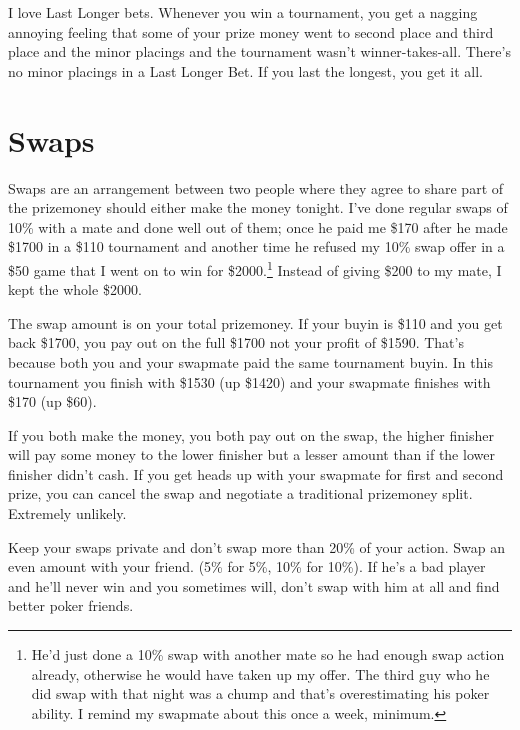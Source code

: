 I love Last Longer bets. Whenever you win a tournament, you get a
nagging annoying feeling that some of your prize money went to second
place and third place and the minor placings and the tournament wasn't
winner-takes-all. There's no minor placings in a Last Longer Bet. If
you last the longest, you get it all.

\newpage

\section{Swaps}


Swaps are an arrangement between two people where they
agree to share part of the prizemoney should
either make the money tonight. I've done regular swaps of 10\% with a mate and
done well out of them; once he paid me
\$170 after he made \$1700 in a \$110 tournament and another time
he refused my 10\% swap offer in a \$50 game that I
went on to win for \$2000.\footnote{He'd
just done a 10\% swap with another mate so he had enough swap action
already, otherwise he would have taken up my offer. The third
guy who he did swap with that night was a chump and that's
overestimating his poker ability. I remind my swapmate about this once
a week, minimum.} Instead of giving \$200 to my mate, I kept the whole
\$2000.

The swap amount is on your total prizemoney. If your buyin is
\$110 and you get back \$1700, you pay out on the full
\$1700 not your profit of \$1590. That's because both you and your
swapmate paid the same tournament buyin.
In this tournament you finish with \$1530 (up \$1420) and your swapmate
finishes with \$170 (up \$60).

If you both make the money, you both pay out on the swap, the
higher finisher will pay some money to the lower finisher but a lesser
amount than if the lower finisher didn't cash. If you get heads up
with your swapmate for first and second prize, you can cancel the swap
and negotiate a traditional prizemoney split. Extremely unlikely.

Keep your swaps private and don't swap more than 20\% of your action.
Swap an even amount with your friend. (5\% for 5\%, 10\% for 10\%).
If he's a bad player and he'll never win and you sometimes will, don't
swap with him at all and find better poker friends.

